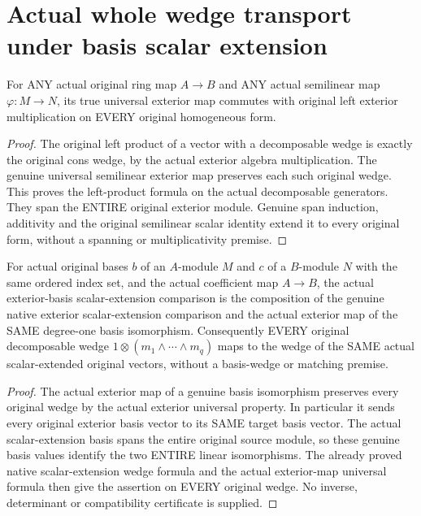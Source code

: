 \section{Actual whole wedge transport under basis scalar extension}
\label{sec:exterior-basis-scalar-extension}

\begin{theorem}
\label{lem:cartier-exterior-semilinear-left-wedge}
\leanok
For ANY actual original ring map $A\to B$ and ANY actual semilinear map
$\varphi:M\to N$, its true universal exterior map commutes with original
left exterior multiplication on EVERY original homogeneous form.
\end{theorem}
\begin{proof}
The original left product of a vector with a decomposable wedge is exactly
the original cons wedge, by the actual exterior algebra multiplication.
The genuine universal semilinear exterior map preserves each such original
wedge. This proves the left-product formula on the actual decomposable
generators. They span the ENTIRE original exterior module. Genuine span
induction, additivity and the original semilinear scalar identity extend it
to every original form, without a spanning or multiplicativity premise.
\end{proof}

\begin{theorem}
\label{lem:cartier-exterior-basis-scalar-extension}
\leanok
For actual original bases $b$ of an $A$-module $M$ and $c$ of a $B$-module
$N$ with the same ordered index set, and the actual coefficient map $A\to B$,
the actual exterior-basis scalar-extension comparison is the composition of
the genuine native exterior scalar-extension comparison and the actual
exterior map of the SAME degree-one basis isomorphism.
Consequently EVERY original decomposable wedge
$1\otimes(m_1\wedge\cdots\wedge m_q)$ maps to the wedge of the SAME actual
scalar-extended original vectors, without a basis-wedge or matching premise.
\end{theorem}
\begin{proof}
The actual exterior map of a genuine basis isomorphism preserves every
original wedge by the actual exterior universal property. In particular it
sends every original exterior basis vector to its SAME target basis vector.
The actual scalar-extension basis spans the entire original source module,
so these genuine basis values identify the two ENTIRE linear isomorphisms.
The already proved native scalar-extension wedge formula and the actual
exterior-map universal formula then give the assertion on EVERY original
wedge. No inverse, determinant or compatibility certificate is supplied.
\end{proof}

